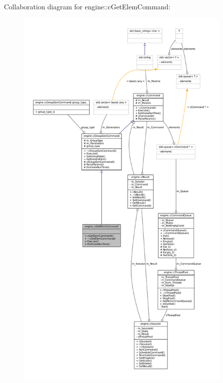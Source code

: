 \-Collaboration diagram for engine\-:\-:c\-Get\-Elem\-Command\-:\nopagebreak
\begin{figure}[H]
\begin{center}
\leavevmode
\includegraphics[height=550pt]{classengine_1_1cGetElemCommand__coll__graph}
\end{center}
\end{figure}
